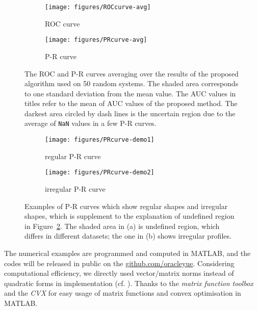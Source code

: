 \documentclass[letterpaper,10pt,journal,final]{IEEEtran}
\theoremstyle{definition}
\theoremstyle{remark}
\begin{document}
\begin{figure}[htbp]
  \centering
  \begin{subfigure}[b]{0.24\textwidth}
    \texttt{[image: figures/ROCcurve-avg]}
    \caption{ROC curve}
    \label{subfig:ROC-avg}
  \end{subfigure}
  \begin{subfigure}[b]{0.24\textwidth}
    \texttt{[image: figures/PRcurve-avg]}
    \caption{P-R curve}
    \label{subfig:PR-avg}
  \end{subfigure}
  \caption{The ROC and P-R curves averaging over the results of the proposed
    algorithm used on 50 random systems. The shaded area corresponds to one
    standard deviation from the mean value. The AUC values in titles refer to
    the mean of AUC values of the proposed method. The darkest area circled by
    dash lines is the uncertain region due to the average of \texttt{NaN} values
    in a few P-R curves.}
  \label{fig:ROC-PR-curve-avg}
\end{figure}

\begin{figure}[htbp]
  \centering
  \begin{subfigure}[b]{.24\textwidth}
    \texttt{[image: figures/PRcurve-demo1]}
    \caption{regular P-R curve}
    \label{subfig:ROC-reg}
  \end{subfigure}
  \begin{subfigure}[b]{.24\textwidth}
    \texttt{[image: figures/PRcurve-demo2]}
    \caption{irregular P-R curve}
    \label{subfig:PR-irreg}
  \end{subfigure}
  \caption{Examples of P-R curves which show regular shapes and irregular
    shapes, which is supplement to the explanation of undefined region in
    Figure~\ref{subfig:PR-avg}. The shaded area in (a) is undefined region,
    which differs in different datasets; the one in (b) shows irregular
    profiles.}
  \label{fig:PR-PR-curve-reg}
\end{figure}

The numerical examples are programmed and computed in MATLAB, and the codes will
be released in public on the
\href{https://github.com/oracleyue}{github.com/oracleyue}. Considering
computational efficiency, we directly used vector/matrix norms instead of
quadratic forms in implementation (cf. \cite[chap.~11.1]{cvx-manual}).  Thanks
to the \emph{matrix function toolbox} \cite{matrix-function-toolbox} and the
\emph{CVX} \cite{cvx} for easy usage of matrix functions and convex
optimisation in MATLAB.
\end{document}
